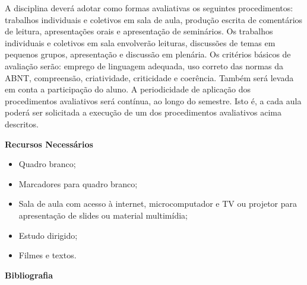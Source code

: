 \noindent
         A disciplina deverá adotar como formas avaliativas os seguintes procedimentos: trabalhos individuais e coletivos em sala de aula, produção escrita de comentários de leitura, apresentações orais e apresentação de seminários. Os trabalhos individuais e coletivos em sala envolverão leituras, discussões de temas em pequenos grupos, apresentação e discussão em plenária. Os critérios básicos de avaliação serão: emprego de linguagem adequada, uso correto das normas da ABNT, compreensão, criatividade, criticidade e coerência. Também será levada em conta a participação do aluno. A periodicidade de aplicação dos procedimentos avaliativos será contínua, ao longo do semestre. Isto é, a cada aula poderá ser solicitada a execução de um dos procedimentos avaliativos acima descritos.

\begin{snugshade}\begin{center}\textbf{
    Recursos Necessários
    \vphantom{q} %
}\end{center}\end{snugshade}

\begin{itemize}
  \item Quadro branco;
  \item Marcadores para quadro branco;
  \item Sala de aula com acesso à internet, microcomputador e TV ou projetor para apresentação de slides ou material multimídia;
  \item Estudo dirigido;
  \item Filmes e textos.
\end{itemize}


\begin{snugshade}\begin{center}\textbf{
    Bibliografia
}\end{center}\end{snugshade}

